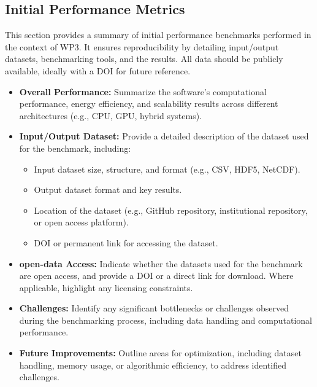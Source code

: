 \subsection{Initial Performance Metrics}
\label{sec:WP3:Arcane Framework:metrics}

This section provides a summary of initial performance benchmarks performed in the context of WP3. It ensures reproducibility by detailing input/output datasets, benchmarking tools, and the results. All data should be publicly available, ideally with a DOI for future reference.

\begin{itemize}
    \item \textbf{Overall Performance:} Summarize the software's computational performance, energy efficiency, and scalability results across different architectures (e.g., CPU, GPU, hybrid systems).
    \item \textbf{Input/Output Dataset:} Provide a detailed description of the dataset used for the benchmark, including:
        \begin{itemize}
            \item Input dataset size, structure, and format (e.g., CSV, HDF5, NetCDF).
            \item Output dataset format and key results.
            \item Location of the dataset (e.g., GitHub repository, institutional repository, or open access platform).
            \item DOI or permanent link for accessing the dataset.
        \end{itemize}
    \item \textbf{open-data Access:} Indicate whether the datasets used for the benchmark are open access, and provide a DOI or a direct link for download. Where applicable, highlight any licensing constraints.
    \item \textbf{Challenges:} Identify any significant bottlenecks or challenges observed during the benchmarking process, including data handling and computational performance.
    \item \textbf{Future Improvements:} Outline areas for optimization, including dataset handling, memory usage, or algorithmic efficiency, to address identified challenges.
\end{itemize}


